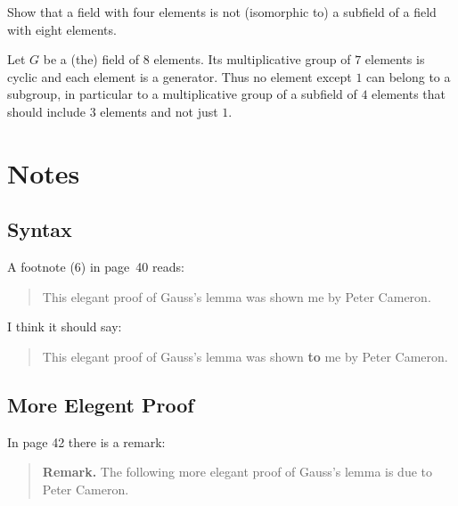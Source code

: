 \begin{myenumerate}
\item
\begin{excopy}
Show that a field with four elements is not (isomorphic to)
a subfield of a field with eight elements.
\end{excopy}

Let $G$ be a (the) field of $8$ elements. Its multiplicative group
of $7$ elements is cyclic and each element is a generator.
Thus no element except $1$ can belong to a subgroup, in particular
to a multiplicative group of a subfield of $4$ elements
that should include $3$ elements and not just $1$.

\end{myenumerate}




\section{Notes}


\subsection{Syntax}

A footnote (6) in page~40 reads:
\begin{quotation}
This elegant proof of Gauss's  lemma was shown me by Peter Cameron.
\end{quotation}

I think it should say:
\begin{quotation}
This elegant proof of Gauss's lemma was shown \textbf{to} me by Peter Cameron.
\end{quotation}

\subsection{More Elegent Proof}

In page 42 there is a remark:
\begin{quotation}
\textbf{Remark.} The following more elegant proof of Gauss's lemma
is due to Peter Cameron.
\end{quotation}

